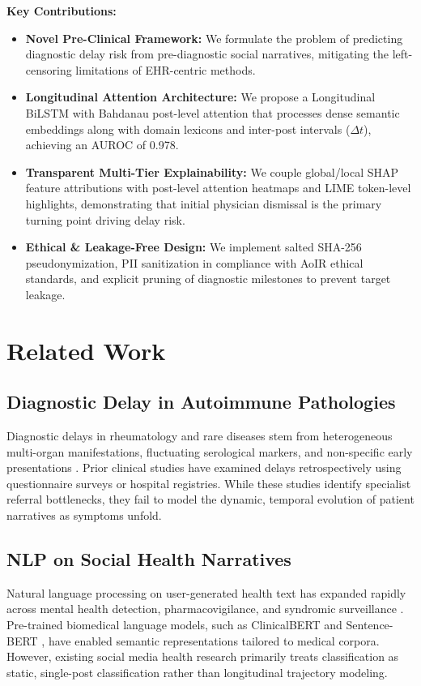 \documentclass[runningheads]{llncs}
\begin{document}
\noindent\textbf{Key Contributions:}
\begin{itemize}
    \item \textbf{Novel Pre-Clinical Framework:} We formulate the problem of predicting diagnostic delay risk from pre-diagnostic social narratives, mitigating the left-censoring limitations of EHR-centric methods.
    \item \textbf{Longitudinal Attention Architecture:} We propose a Longitudinal BiLSTM with Bahdanau post-level attention that processes dense semantic embeddings along with domain lexicons and inter-post intervals ($\Delta t$), achieving an AUROC of 0.978.
    \item \textbf{Transparent Multi-Tier Explainability:} We couple global/local SHAP feature attributions with post-level attention heatmaps and LIME token-level highlights, demonstrating that initial physician dismissal is the primary turning point driving delay risk.
    \item \textbf{Ethical \& Leakage-Free Design:} We implement salted SHA-256 pseudonymization, PII sanitization in compliance with AoIR ethical standards, and explicit pruning of diagnostic milestones to prevent target leakage.
\end{itemize}

\section{Related Work}
\label{sec:related}

\subsection{Diagnostic Delay in Autoimmune Pathologies}
Diagnostic delays in rheumatology and rare diseases stem from heterogeneous multi-organ manifestations, fluctuating serological markers, and non-specific early presentations \cite{franz2020diagnostic}. Prior clinical studies have examined delays retrospectively using questionnaire surveys or hospital registries. While these studies identify specialist referral bottlenecks, they fail to model the dynamic, temporal evolution of patient narratives as symptoms unfold.

\subsection{NLP on Social Health Narratives}
Natural language processing on user-generated health text has expanded rapidly across mental health detection, pharmacovigilance, and syndromic surveillance \cite{alghowinem2020cross}. Pre-trained biomedical language models, such as ClinicalBERT \cite{alsentzer2019publicly} and Sentence-BERT \cite{reimers2019sentence}, have enabled semantic representations tailored to medical corpora. However, existing social media health research primarily treats classification as static, single-post classification rather than longitudinal trajectory modeling.
\end{document}
